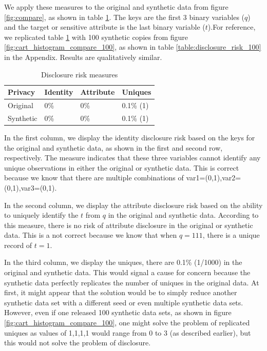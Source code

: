 \documentclass[runningheads]{llncs}
\begin{document}
We apply these measures to the original and synthetic data from figure \ref{fig:compare}, as shown in table \ref{table:disclosure_risk}.  The keys are the first 3 binary variables ($q$) and the target or sensitive attribute is the last binary variable ($t$).For reference, we replicated table \ref{table:disclosure_risk} with 100 synthetic copies from figure \ref{fig:cart_histogram_compare_100}, as shown in table \ref{table:disclosure_risk_100} in the Appendix.  Results are qualitatively similar.  

\begin{table}[]
    \centering
    \caption{Disclosure risk measures}
    \begin{tabular}{llll}
        \toprule
        Privacy   & Identity & Attribute & Uniques \\ \midrule
        Original  & 0\%      & 0\%       & 0.1\% (1) \\
        Synthetic & 0\%      & 0\%       & 0.1\% (1) \\ 
        \bottomrule
    \end{tabular}
    \label{table:disclosure_risk}
\end{table}

In the first column, we display the identity disclosure risk based on the keys for the original and synthetic data, as shown in the first and second row, respectively.  The measure indicates that these three variables cannot identify any unique observations in either the original or synthetic data.  This is correct because we know that there are multiple combinations of var1=(0,1),var2=(0,1),var3=(0,1).  

In the second column, we display the attribute disclosure risk based on the ability to uniquely identify the $t$ from $q$ in the original and synthetic data.  According to this measure, there is no risk of attribute disclosure in the original or synthetic data.  This is a not correct because we know that when $q=111$, there is a unique record of $t=1$.  

In the third column, we display the uniques, there are 0.1\% (1/1000) in the original and synthetic data.  This would signal a cause for concern because the synthetic data perfectly replicates the number of uniques in the original data.  At first, it might appear that the solution would be to simply reduce another synthetic data set with a different seed or even multiple synthetic data sets.  However, even if one released 100 synthetic data sets, as shown in figure \ref{fig:cart_histogram_compare_100}, one might solve the problem of replicated uniques as values of 1,1,1,1 would range from 0 to 3 (as described earlier), but this would not solve the problem of disclosure.  
\end{document}
